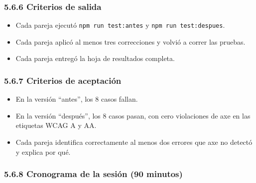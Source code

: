\documentclass[10pt,letterpaper,onecolumn]{IEEEtran}
\begin{document}
\subsubsection{5.6.6 Criterios de salida}\label{criterios-de-salida}

\begin{itemize}
\item
  Cada pareja ejecutó \texttt{npm run test:\allowbreak{}antes} y \texttt{npm run test:\allowbreak{}despues}.
\item
  Cada pareja aplicó al menos tres correcciones y volvió a correr las pruebas.
\item
  Cada pareja entregó la hoja de resultados completa.
\end{itemize}

\subsubsection{5.6.7 Criterios de aceptación}\label{criterios-de-aceptaciuxf3n}

\begin{itemize}
\item
  En la versión ``antes'', los 8 casos fallan.
\item
  En la versión ``después'', los 8 casos pasan, con cero violaciones de axe en las etiquetas WCAG A y AA.
\item
  Cada pareja identifica correctamente al menos dos errores que axe no detectó y explica por qué.
\end{itemize}

\subsubsection{5.6.8 Cronograma de la sesión (90 minutos)}\label{cronograma-de-la-sesiuxf3n-90-minutos}
\end{document}

